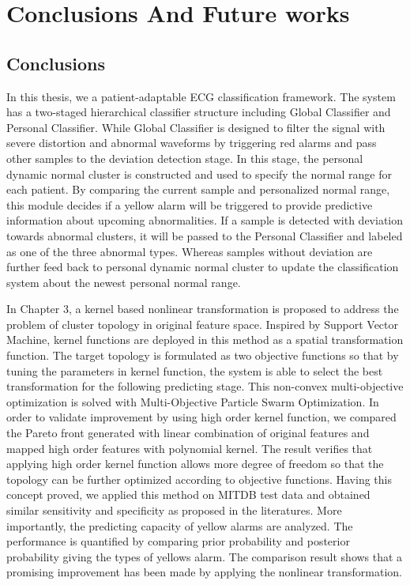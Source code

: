  \chapter{Conclusions And Future works} \label{ch:Discussion And Resuls}
 
\section{Conclusions}
In this thesis, we a patient-adaptable ECG classification framework. The system has a two-staged hierarchical classifier structure including Global Classifier and Personal Classifier. While Global Classifier is designed to filter the signal with severe distortion and abnormal waveforms by triggering red alarms and pass other samples to the deviation detection stage. In this stage, the personal dynamic normal cluster is constructed and used to specify the normal range for each patient. By comparing the current sample and personalized normal range, this module decides if a yellow alarm will be triggered to provide predictive information about upcoming abnormalities. If a sample is detected with deviation towards abnormal clusters, it will be passed to the Personal Classifier and labeled as one of the three abnormal types. Whereas samples without deviation are further feed back to personal dynamic normal cluster to update the classification system about the newest personal normal range.

In Chapter 3, a kernel based nonlinear transformation is proposed to address the problem of cluster topology in original feature space. Inspired by Support Vector Machine, kernel functions are deployed in this method as a spatial transformation function. The target topology is formulated as two objective functions so that by tuning the parameters in kernel function, the system is able to select the best transformation for the following predicting stage. This non-convex multi-objective optimization is solved with Multi-Objective Particle Swarm Optimization. In order to validate improvement by using high order kernel function, we compared the Pareto front generated with linear combination of original features and mapped high order features with polynomial kernel. The result verifies that applying high order kernel function allows more degree of freedom so that the topology can be further optimized according to objective functions. Having this concept proved, we applied this method on MITDB test data and obtained similar sensitivity and specificity as proposed in the literatures. More importantly, the predicting capacity of yellow alarms are analyzed. The performance is quantified by comparing prior probability and posterior probability giving the types of yellows alarm. The comparison result shows that a promising improvement has been made by applying the nonlinear transformation. 

